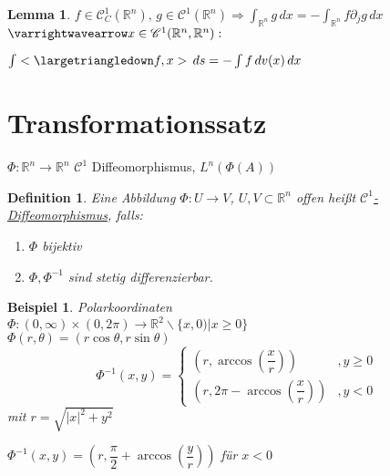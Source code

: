 \documentclass[11pt]{memoir}
\theoremstyle{changebreak}
\newtheorem{Definition}{Definition}[chapter]
\newtheorem{Beispiel}{Beispiel}[chapter]
\newtheorem{Lemma}{Lemma}[chapter]
\begin{document}
\begin{Lemma}
$f \in \mathscr C^1_C(\mathbb R^n), \, g\in \mathscr C^1(\mathbb R^n) \Rightarrow \int_{\mathbb R^n}g\, dx = - \int_{\mathbb R^n}f \partial_j g\, dx$ \\
$\varrightwavearrow x \in \mathscr C^1(\mathbb R^n, \mathbb R^n):$
\begin{center}
	$\int <\largetriangledown f, x>\, ds = - \int f\, dv(x) \,dx$
\end{center}
\end{Lemma}


\section{Transformationssatz}


$\Phi: \mathbb R^n \rightarrow \mathbb R^n$ $\mathscr C^1$ Diffeomorphismus, $L^n(\Phi(A))$

\begin{Definition}
Eine Abbildung $\Phi: U \rightarrow V$, $U, V \subset \mathbb R^n$ offen heißt \underline{$\mathscr C^1$-Diffeomorphismus}, falls:
\begin{enumerate}
	\item $\Phi$ bijektiv
	\item $\Phi, \Phi^{-1}$ sind stetig differenzierbar.
\end{enumerate}
\end{Definition}

\begin{Beispiel}
\emph{Polarkoordinaten} \\
$\Phi: (0, \infty) \times (0, 2\pi) \rightarrow \mathbb R^2 \backslash \{x, 0)| x \geq 0\}$ \\
$\Phi(r, \theta) = (r \cos \theta, r \sin \theta)$ \\
\begin{equation}
	\Phi^{-1}(x, y) =
	\begin{cases}
		(r, \arccos\left(\dfrac{x}{r}\right)) & , y \geq 0 \\
		(r, 2\pi - \arccos\left(\dfrac{x}{r}\right)) & , y < 0
	\end{cases}
\end{equation}
mit $r = \sqrt{|x|^2 + y^2} $\\
\begin{center}
	$\Phi^{-1} (x, y) = \left(r, \dfrac{\pi}{2} + \arccos\left(\dfrac{y}{r}\right)\right)$ \quad für $x < 0$
\end{center}

\end{Beispiel}
\end{document}
